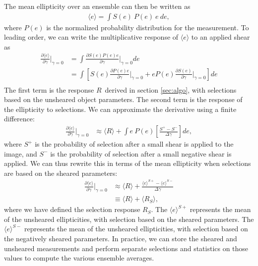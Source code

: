 \documentclass[usegraphicx,usenatbib]{mn2e}
\newcommand{\mest}{e}
\newcommand{\mcalR}{$R$}
\newcommand{\mcalRS}{$R_{S}$}
\begin{document}
The mean ellipticity over an ensemble can then be written as 
\begin{align}
    \langle \mest \rangle = \int S(\mest)~P(\mest)~\mest~d\mest,
\end{align}
where $P(\mest)$ is the normalized probability
distribution for the measurement.
To leading order, we can write the multiplicative response of $\langle \mest \rangle$ 
to an applied shear as
\begin{align}
    \frac{\partial \langle \mest \rangle}{\partial \gamma}\bigg|_{\gamma=0} 
    &= \int \frac{\partial S(\mest) P(\mest) \mest  }{\partial \gamma}\bigg|_{\gamma=0} d\mest \nonumber \\
    &= \int \left[ S(\mest) \frac{\partial  P(\mest) \mest  }{\partial \gamma}\bigg|_{\gamma=0} + \mest P(\mest) \frac{\partial S(\mest)}{\partial \gamma}\bigg|_{\gamma=0} \right] d\mest \\
\end{align}
The first term is the response \mcalR\ derived in section \ref{sec:algo}, with
selections based on the unsheared object parameters.  The second term is the
response of the ellipticity to selections.  We can approximate the derivative
using a finite difference:
\begin{align}
    \frac{\partial \langle \mest \rangle}{\partial \gamma}\bigg|_{\gamma=0}
    &\approx
    \langle \mbox{\mcalR} \rangle + \int \mest~P(\mest) \left[ \frac{ S^+ - S^- }{\Delta \gamma}\right] d\mest,
\end{align}
where $S^+$ is the probability of selection after a small shear is applied to
the image, and $S^-$ is the probability of selection after a small negative
shear is applied.  We can thus rewrite this in terms of the mean ellipticity
when selections are based on the sheared parameters:
\begin{align}
\frac{\partial \langle \mest \rangle}{\partial \gamma}\bigg|_{\gamma=0} &\approx
    \langle R \rangle + \frac{\langle \mest \rangle^{S+} - \langle \mest \rangle^{S-}}{\Delta \gamma} \nonumber \\
       &\equiv \langle R \rangle + \langle \mbox{\mcalRS} \rangle,
\end{align}
where we have defined the selection response \mcalRS. The $\langle \mest
\rangle^{S+}$ represents the mean of the unsheared ellipticities, with
selection based on the sheared parameters. The $\langle \mest \rangle^{S-}$
represents the mean of the unsheared ellipticities, with selection based on the
negatively sheared parameters.  In practice, we can store the sheared and
unsheared measurements and perform separate selections and statistics on those
values to compute the various ensemble averages.
\end{document}
